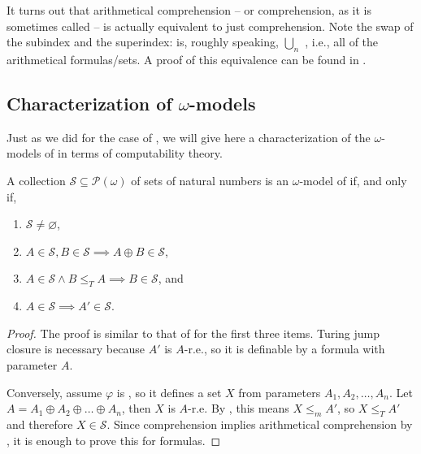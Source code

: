 \documentclass[../main.tex]{memoir}
\begin{document}
\begin{remark}
  \label{remark:aca-re-comprehension}
  It turns out that arithmetical comprehension -- or  comprehension, as it is sometimes called -- is actually equivalent to just \re comprehension. Note the swap of the subindex and the superindex:  is, roughly speaking, $\bigcup_{n}$ , i.e., all of the arithmetical formulas/sets. A proof of this equivalence can be found in \cite{simpson}.
\end{remark}

\subsection{Characterization of $\omega$-models}

Just as we did for the case of \rca, we will give here a characterization of the $\omega$-models of \aca in terms of computability theory.

\begin{theorem}
  A collection $\mathcal{S} \subseteq \mathcal{P}(\omega)$ of sets of natural numbers is an $\omega$-model of \aca if, and only if,

  \begin{enumerate}
  \item $\mathcal{S} \neq \varnothing$,
  \item \label{item:join-closure} $A \in \mathcal{S}, B \in \mathcal{S} \implies A \oplus B \in \mathcal{S}$,
  \item $A \in \mathcal{S} \land B \le_T A \implies B \in \mathcal{S}$, and
  \item $A \in \mathcal{S} \implies A' \in \mathcal{S}$.
  \end{enumerate}
\end{theorem}
\begin{proof}
  The proof is similar to that of \rca for the first three items. Turing jump closure is necessary because $A'$ is $A$-r.e., so it is definable by a \re formula with parameter $A$.

  Conversely, assume $\varphi$ is \re, so it defines a set $X$ from parameters $A_1, A_2, \ldots, A_n$. Let $A = A_1 \oplus A_2 \oplus \ldots \oplus A_n$, then $X$ is $A$-r.e. By , this means $X \le_m A'$, so $X \le_T A'$ and therefore $X \in \mathcal{S}$. Since \re comprehension implies arithmetical comprehension by , it is enough to prove this for \re formulas.
\end{proof}
\end{document}
